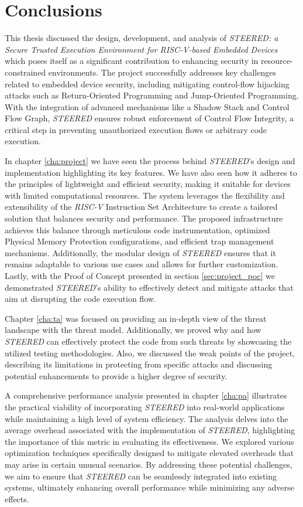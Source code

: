 \chapter{Conclusions}
\label{cha:conclusions}

This thesis discussed the design, development, and analysis of \textit{STEERED: a
Secure Trusted Execution Environment for RISC-V-based Embedded Devices} which poses
itself as a significant contribution to enhancing security in resource-constrained
environments. The project successfully addresses key challenges related to
embedded device security, including mitigating control-flow hijacking attacks such
as Return-Oriented Programming and Jump-Oriented Programming. With the
integration of advanced mechanisms like a Shadow Stack and Control Flow Graph, \textit{STEERED}
ensures robust enforcement of Control Flow Integrity, a critical step in preventing
unauthorized execution flows or arbitrary code execution.

In chapter \ref{cha:project} we have seen the process behind \textit{STEERED}'s
design and implementation highlighting its key features. We have also seen how it
adheres to the principles of lightweight and efficient security, making it
suitable for devices with limited computational resources. The system leverages the
flexibility and extensibility of the \textit{RISC-V} Instruction Set
Architecture to create a tailored solution that balances security and
performance. The proposed infrastructure achieves this balance through meticulous
code instrumentation, optimized Physical Memory Protection configurations, and efficient
trap management mechanisms. Additionally, the modular design of \textit{STEERED}
ensures that it remains adaptable to various use cases and allows for further
customization. Lastly, with the Proof of Concept presented in section
\ref{sec:project_poc} we demonstrated \textit{STEERED}'s ability to effectively detect
and mitigate attacks that aim at disrupting the code execution flow.

Chapter \ref{cha:ta} was focused on providing an in-depth view of the threat landscape
with the threat model. Additionally, we proved why and how \textit{STEERED} can
effectively protect the code from such threats by showcasing the utilized
testing methodologies. Also, we discussed the weak points of the project, describing
its limitations in protecting from specific attacks and discussing potential enhancements
to provide a higher degree of security.

A comprehensive performance analysis presented in chapter \ref{cha:pa} illustrates
the practical viability of incorporating \textit{STEERED} into real-world
applications while maintaining a high level of system efficiency. The analysis delves
into the average overhead associated with the implementation of \textit{STEERED},
highlighting the importance of this metric in evaluating its effectiveness. We
explored various optimization techniques specifically designed to mitigate
elevated overheads that may arise in certain unusual scenarios. By addressing these
potential challenges, we aim to ensure that \textit{STEERED} can be seamlessly integrated
into existing systems, ultimately enhancing overall performance while minimizing
any adverse effects.

